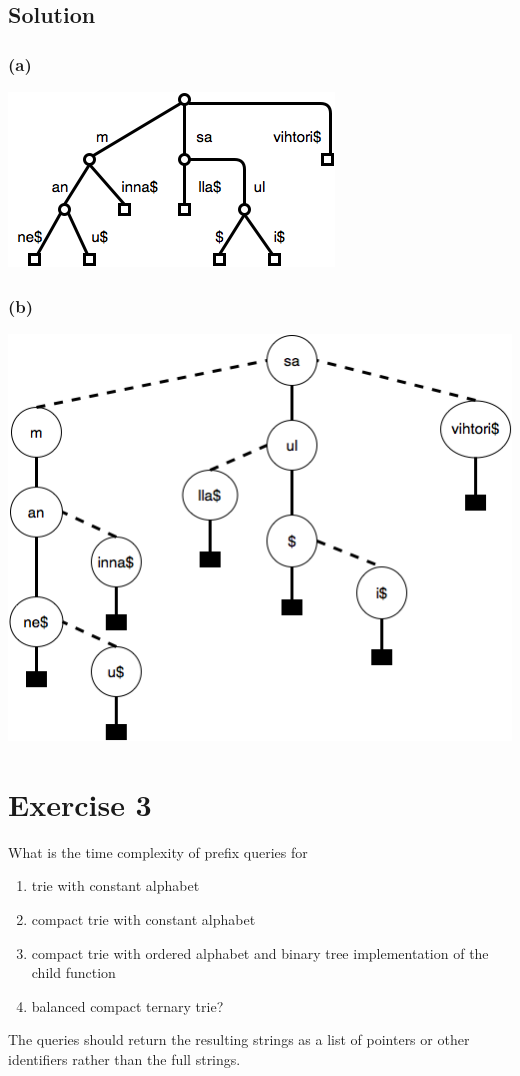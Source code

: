 \documentclass[10pt]{article}
\begin{document}
\subsection*{Solution}
\subsubsection*{(a)}
\begin{center}
\includegraphics[scale=0.65]{CompactTrie}
\end{center}

\subsubsection*{(b)}
\begin{center}
\includegraphics[scale=0.65]{TernaryTrie}
\end{center}

\section*{Exercise 3}
\color{blue}
What is the time complexity of prefix queries for 
\begin{enumerate}[label=(\alph*)]
\item trie with constant alphabet
\item compact trie with constant alphabet
\item compact trie with ordered alphabet and binary tree implementation of the child function
\item balanced compact ternary trie?
\end{enumerate}
The queries should return the resulting strings as a list of pointers or other identifiers rather than the full strings.
\color{black}
\end{document}
